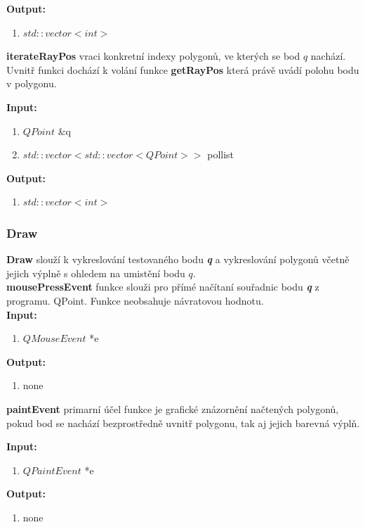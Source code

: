 \documentclass{article}
\begin{document}
\bigskip 
\textbf{Output:}
\begin{enumerate} 
\item $std::vector<int>$
\end{enumerate}

\bigskip 

\textbf{iterateRayPos} vraci konkretní indexy polygonů, ve kterých se bod $q$ nachází. Uvnitř funkci dochází k volání funkce \textbf{getRayPos} která právě uvádí polohu bodu v polygonu.
 \\ 

\bigskip 

 \textbf{Input:}
\begin{enumerate} 
\item $QPoint$ \&q
\item $std::vector<std::vector<QPoint>> $ pollist
\end{enumerate}

\bigskip 
\textbf{Output:}
\begin{enumerate} 
\item $std::vector<int>$
\end{enumerate}

\subsubsection{Draw} 


\bigskip 

\textbf{Draw} slouží k vykreslování testovaného bodu \textit{\textbf {q}} a vykreslování polygonů včetně jejich 
výplně s ohledem na umistění bodu  $q$.\\


\bigskip 
\textbf{mousePressEvent} funkce slouži pro přímé načítaní souřadnic bodu \textit{\textbf {q}} z programu. 
QPoint. Funkce neobsahuje návratovou hodnotu.\\ 
\bigskip 
 \textbf{Input:}
\begin{enumerate} 
\item $QMouseEvent$ *e
\end{enumerate}
\bigskip 
 \textbf{Output:}
\begin{enumerate} 
\item none
\end{enumerate}
\bigskip

\textbf{paintEvent} primarní účel funkce je grafické znázornění načtených polygonů, pokud bod se nachází bezprostředně uvnitř polygonu, tak aj jejich barevná výplň. 

\bigskip 
 \textbf{Input:}
\begin{enumerate} 
\item $QPaintEvent $ *e
\end{enumerate}
\bigskip 
 \textbf{Output:}
\begin{enumerate} 
\item none
\end{enumerate}
\bigskip
\end{document}
